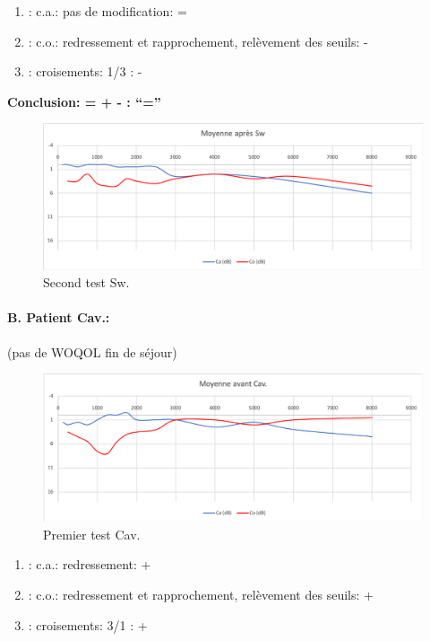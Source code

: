 	\begin{enumerate}

 		\item : c.a.: pas de modification: = %

 		\item : c.o.: redressement et rapprochement,
                  relèvement des seuils: -       %
 		\item : croisements: 1/3 :  -

                \end{enumerate}

                \textbf{  Conclusion:  = +  -        : ``=''}

                \begin{figure}[th]
\centering
\includegraphics[width=0.7\linewidth]{images/graphiques/sw_post.png}
\caption[Moyenne OG+OD]{Second test Sw.}

\end{figure}




\paragraph{B. Patient Cav.: }

(pas de WOQOL fin de séjour)


\begin{figure}[th]
\centering
\includegraphics[width=0.7\linewidth]{images/graphiques/cav_pre.png}
\caption[Moyenne OG+OD]{Premier test Cav.}

\end{figure}

	\begin{enumerate}

 		\item : c.a.: redressement: +

 		\item : c.o.: redressement et rapprochement, relèvement des seuils: +
 		\item : croisements: 3/1 :  +

                \end{enumerate}

